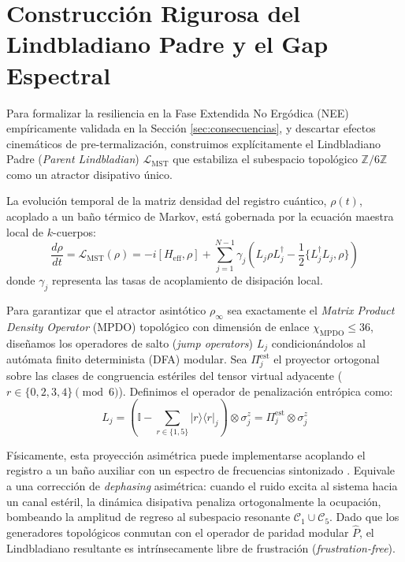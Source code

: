 \documentclass[12pt,a4paper]{article}
\theoremstyle{plain}
\theoremstyle{definition}
\theoremstyle{remark}
\begin{document}
\section{Construcción Rigurosa del Lindbladiano Padre y el Gap Espectral}
\label{app:lindblad_construction}

Para formalizar la resiliencia en la Fase Extendida No Ergódica (NEE) empíricamente validada en la Sección \ref{sec:consecuencias}, y descartar efectos cinemáticos de pre-termalización, construimos explícitamente el Lindbladiano Padre (\textit{Parent Lindbladian}) $\mathcal{L}_{\text{MST}}$ que estabiliza el subespacio topológico $\mathbb{Z}/6\mathbb{Z}$ como un atractor disipativo único.

La evolución temporal de la matriz densidad del registro cuántico, $\rho(t)$, acoplado a un baño térmico de Markov, está gobernada por la ecuación maestra local de $k$-cuerpos:
\begin{equation}
\frac{d\rho}{dt} = \mathcal{L}_{\text{MST}}(\rho) = -i[H_{\text{eff}}, \rho] + \sum_{j=1}^{N-1} \gamma_j \left( L_j \rho L_j^\dagger - \frac{1}{2} \{ L_j^\dagger L_j, \rho \} \right)
\label{eq:app_lindblad_master}
\end{equation}
donde $\gamma_j$ representa las tasas de acoplamiento de disipación local.

Para garantizar que el atractor asintótico $\rho_\infty$ sea exactamente el \textit{Matrix Product Density Operator} (MPDO) topológico con dimensión de enlace $\chi_{\text{MPDO}} \le 36$, diseñamos los operadores de salto (\textit{jump operators}) $L_j$ condicionándolos al autómata finito determinista (DFA) modular. Sea $\Pi_j^{\text{est}}$ el proyector ortogonal sobre las clases de congruencia estériles del tensor virtual adyacente ($r \in \{0,2,3,4\} \pmod 6$). Definimos el operador de penalización entrópica como:
\begin{equation}
L_j = \left( \mathbb{I} - \sum_{r \in \{1,5\}} |r\rangle\langle r|_j \right) \otimes \sigma_j^z = \Pi_j^{\text{est}} \otimes \sigma_j^z
\label{eq:app_jump_operators}
\end{equation}

Físicamente, esta proyección asimétrica puede implementarse acoplando el registro a un baño auxiliar con un espectro de frecuencias sintonizado \cite{Liu2025}. Equivale a una corrección de \textit{dephasing} asimétrica: cuando el ruido excita al sistema hacia un canal estéril, la dinámica disipativa penaliza ortogonalmente la ocupación, bombeando la amplitud de regreso al subespacio resonante $\mathcal{C}_1 \cup \mathcal{C}_5$. Dado que los generadores topológicos conmutan con el operador de paridad modular $\hat{P}$, el Lindbladiano resultante es intrínsecamente libre de frustración (\textit{frustration-free}).
\end{document}
